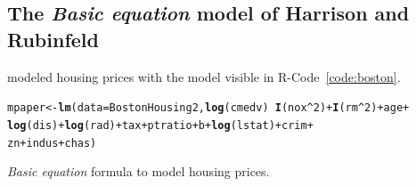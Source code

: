 \documentclass[11pt,a4paper,twoside]{book}\usepackage[]{graphicx}\usepackage[]{xcolor}
\makeatletter
\newcommand{\hlnum}[1]{\textcolor[rgb]{0.686,0.059,0.569}{#1}}%
\newcommand{\hlopt}[1]{\textcolor[rgb]{0,0,0}{#1}}%
\newcommand{\hlstd}[1]{\textcolor[rgb]{0.345,0.345,0.345}{#1}}%
\newcommand{\hlkwb}[1]{\textcolor[rgb]{0.69,0.353,0.396}{#1}}%
\newcommand{\hlkwc}[1]{\textcolor[rgb]{0.333,0.667,0.333}{#1}}%
\newcommand{\hlkwd}[1]{\textcolor[rgb]{0.737,0.353,0.396}{\textbf{#1}}}%
\newenvironment{kframe}{%
 \def\at@end@of@kframe{}%
 \ifinner\ifhmode%
  \def\at@end@of@kframe{\end{minipage}}%
  \begin{minipage}{\columnwidth}%
 \fi\fi%
 \def\FrameCommand##1{\hskip\@totalleftmargin \hskip-\fboxsep
 \colorbox{shadecolor}{##1}\hskip-\fboxsep
     \hskip-\linewidth \hskip-\@totalleftmargin \hskip\columnwidth}%
 \MakeFramed {\advance\hsize-\width
   \@totalleftmargin\z@ \linewidth\hsize
   \@setminipage}}%
 {\par\unskip\endMakeFramed%
 \at@end@of@kframe}
\newenvironment{knitrout}{}{} %
\makeatother
\begin{document}
\vspace{-0.7cm}
\subsection{The \textit{Basic equation} model of Harrison and Rubinfeld}\label{sec:basiceqboston}

\cite{Harrison1978} modeled housing prices with the model visible in \textsf{R}-Code~\ref{code:boston}.
\begin{program}[H]
\begin{knitrout}
\color{fgcolor}\begin{kframe}
\begin{alltt}
\hlstd{mpaper} \hlkwb{<-} \hlkwd{lm}\hlstd{(}\hlkwc{data} \hlstd{= BostonHousing2,} \hlkwd{log}\hlstd{(cmedv)} \hlopt{~} \hlkwd{I}\hlstd{(nox}\hlopt{^}\hlnum{2}\hlstd{)} \hlopt{+}  \hlkwd{I}\hlstd{(rm}\hlopt{^}\hlnum{2}\hlstd{)} \hlopt{+} \hlstd{age} \hlopt{+}
               \hlkwd{log}\hlstd{(dis)} \hlopt{+} \hlkwd{log}\hlstd{(rad)} \hlopt{+} \hlstd{tax} \hlopt{+} \hlstd{ptratio} \hlopt{+} \hlstd{b} \hlopt{+} \hlkwd{log}\hlstd{(lstat)} \hlopt{+} \hlstd{crim} \hlopt{+}
               \hlstd{zn} \hlopt{+} \hlstd{indus} \hlopt{+} \hlstd{chas )}
\end{alltt}
\end{kframe}
\end{knitrout}
\caption{\textit{Basic equation} formula to model housing prices.}\label{code:boston}
\end{program}
\end{document}
